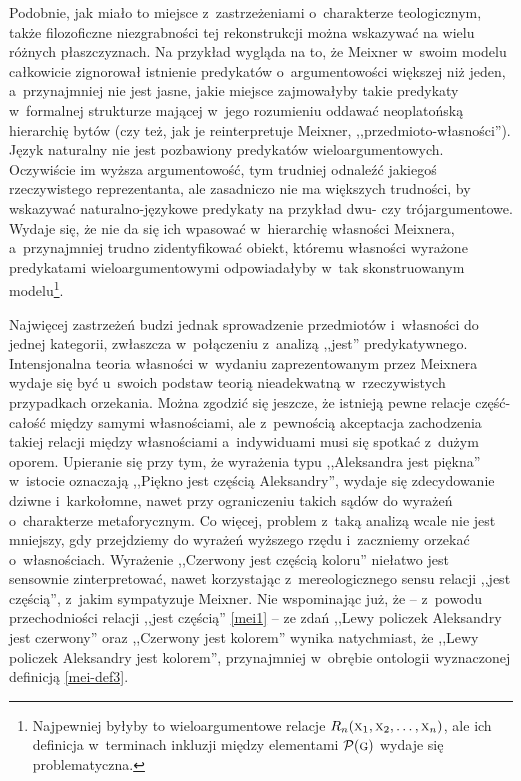 Podobnie, jak miało to miejsce z~zastrzeżeniami o~charakterze teologicznym, także filozoficzne niezgrabności tej rekonstrukcji można wskazywać na wielu różnych płaszczyznach. Na przykład wygląda na to, że Meixner w~swoim modelu całkowicie zignorował istnienie predykatów o~argumentowości większej niż jeden, a~przynajmniej nie jest jasne, jakie miejsce zajmowałyby takie predykaty w~formalnej strukturze mającej w~jego rozumieniu oddawać neoplatońską hierarchię bytów (czy też, jak je reinterpretuje Meixner, ,,przedmioto-własności''). Język naturalny nie jest pozbawiony predykatów wieloargumentowych. Oczywiście im wyższa argumentowość, tym trudniej odnaleźć jakiegoś rzeczywistego reprezentanta, ale zasadniczo nie ma większych trudności, by wskazywać naturalno-językowe predykaty na przykład dwu- czy trójargumentowe. Wydaje się, że nie da się ich wpasować w~hierarchię własności Meixnera, a~przynajmniej trudno zidentyfikować obiekt, któremu własności wyrażone predykatami wieloargumentowymi odpowiadałyby w~tak skonstruowanym modelu\footnote{Najpewniej byłyby to wieloargumentowe relacje $R_n(\textsc{x}_1, \textsc{x}_2,\ldots, \textsc{x}_n)$, ale ich definicja w~terminach inkluzji między elementami $\mathcal{P}(\textsc{g})$ wydaje się problematyczna.}.

Najwięcej zastrzeżeń budzi jednak sprowadzenie przedmiotów i~własności do jednej kategorii, zwłaszcza w~połączeniu z~analizą ,,jest'' predykatywnego. Intensjonalna teoria własności w~wydaniu zaprezentowanym przez Meixnera wydaje się być u~swoich podstaw teorią nieadekwatną w~rzeczywistych przypadkach orzekania. Można zgodzić się jeszcze, że istnieją pewne relacje część-całość między samymi własnościami, ale z~pewnością akceptacja zachodzenia takiej relacji między własnościami a~indywiduami musi się spotkać z~dużym oporem. Upieranie się przy tym, że wyrażenia typu ,,Aleksandra jest piękna'' w~istocie oznaczają ,,Piękno jest częścią Aleksandry'', wydaje się zdecydowanie dziwne i~karkołomne, nawet przy ograniczeniu takich sądów do wyrażeń o~charakterze metaforycznym. Co więcej, problem z~taką analizą wcale nie jest mniejszy, gdy przejdziemy do wyrażeń wyższego rzędu i~zaczniemy orzekać o~własnościach. Wyrażenie ,,Czerwony jest częścią koloru'' niełatwo jest sensownie zinterpretować, nawet korzystając z~mereologicznego sensu relacji ,,jest częścią'', z~jakim sympatyzuje Meixner. Nie wspominając już, że -- z~powodu przechodniości relacji ,,jest częścią'' \eqref{mei1} -- ze zdań ,,Lewy policzek Aleksandry jest czerwony'' oraz ,,Czerwony jest kolorem'' wynika natychmiast, że ,,Lewy policzek Aleksandry jest kolorem'', przynajmniej w~obrębie ontologii wyznaczonej definicją \ref{mei-def3}.


